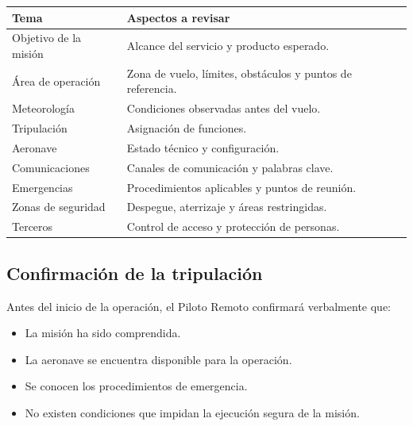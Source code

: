 \begin{longtable}{|p{5cm}|p{9cm}|}

\hline

\textbf{Tema} &
\textbf{Aspectos a revisar}

\\ \hline

Objetivo de la misión &
Alcance del servicio y producto esperado.

\\ \hline

Área de operación &
Zona de vuelo, límites, obstáculos y puntos de referencia.

\\ \hline

Meteorología &
Condiciones observadas antes del vuelo.

\\ \hline

Tripulación &
Asignación de funciones.

\\ \hline

Aeronave &
Estado técnico y configuración.

\\ \hline

Comunicaciones &
Canales de comunicación y palabras clave.

\\ \hline

Emergencias &
Procedimientos aplicables y puntos de reunión.

\\ \hline

Zonas de seguridad &
Despegue, aterrizaje y áreas restringidas.

\\ \hline

Terceros &
Control de acceso y protección de personas.

\\ \hline

\end{longtable}


\subsection{Confirmación de la tripulación}

Antes del inicio de la operación, el Piloto Remoto confirmará verbalmente que:

\begin{itemize}

\item La misión ha sido comprendida.

\item La aeronave se encuentra disponible para la operación.

\item Se conocen los procedimientos de emergencia.

\item No existen condiciones que impidan la ejecución segura de la misión.

\end{itemize}

